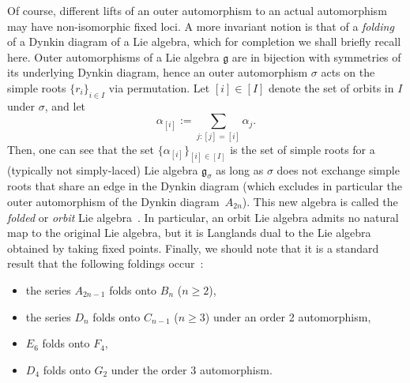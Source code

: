 \documentclass[10pt,a4paper]{amsart}
\numberwithin{equation}{section}
\begin{document}
 Of course, different lifts of an outer automorphism to an actual automorphism may have non-isomorphic fixed loci. A more invariant notion is that of a \textit{folding} of a Dynkin diagram of a Lie algebra, which for completion we shall briefly recall here. Outer automorphisms of a Lie algebra $\mathfrak{g}$ are in bijection with symmetries of its underlying Dynkin diagram, hence an outer automorphism $\sigma$ acts on the simple roots $\{ r_i \}_{i \in I}$ via permutation. Let $[i] \in [I]$ denote the set of orbits in $I$ under $\sigma$, and let
 \[ \alpha_{[i]} := \sum_{j \colon [j] = [i]} \alpha_j.\] Then, one can see that the set $\{ \alpha_{[i]} \}_{[i] \in [I]}$ is the set of simple roots for a (typically not simply-laced) Lie algebra $\mathfrak{g}_\sigma$ as long as $\sigma$ does not exchange simple roots that share an edge in the Dynkin diagram (which excludes in particular the outer automorphism of the Dynkin diagram~$A_{2n}$). This new algebra is called the \textit{folded} or \textit{orbit} Lie algebra~\cite{FSS}. In particular, an orbit Lie algebra admits no natural map to the original Lie algebra, but it is Langlands dual to the Lie algebra obtained by taking fixed points. Finally, we should note that it is a standard result that the following foldings occur~\cite{Springer}:
 \begin{itemize}\itemsep=0pt
 \item the series $A_{2n-1}$ folds onto $B_n$ ($n \geq 2$),
 \item the series $D_n$ folds onto $C_{n-1}$ ($n \geq 3$) under an order 2 automorphism,
 \item $E_6$ folds onto $F_4$,
 \item $D_4$ folds onto $G_2$ under the order 3 automorphism.
 \end{itemize}
\end{document}
